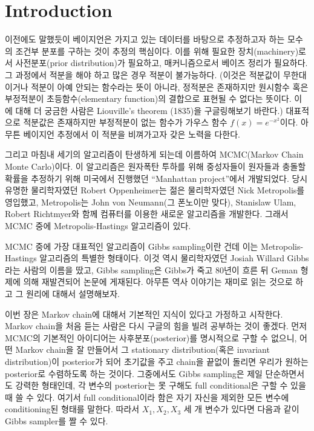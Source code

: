 \documentclass[a4paper, 10pt]{book}
\begin{document}
\section{Introduction}
  이전에도 말했듯이 베이지언은 가지고 있는 데이터를 바탕으로 추정하고자 하는 모수의 조건부 분포를 구하는 것이 추정의 핵심이다. 이를 위해 필요한 장치(machinery)로서 사전분포(prior distribution)가 필요하고, 매커니즘으로서 베이즈 정리가 필요하다. 그 과정에서 적분을 해야 하고 많은 경우 적분이 불가능하다. (이것은 적분값이 무한대이거나 적분이 아예 안되는 함수라는 뜻이 아니라, 정적분은 존재하지만 원시함수 혹은 부정적분이 초등함수(elementary function)의 결합으로 표현될 수 없다는 뜻이다. 이에 대해 더 궁금한 사람은 Liouville's theorem (1835)을 구글링해보기 바란다.) 대표적으로 적분값은 존재하지만 부정적분이 없는 함수가 가우스 함수 $f\left(x\right)= e^{-x^{2}}$이다. 아무튼 베이지언 추정에서 이 적분을 비껴가고자 갖은 노력을 다한다.\par
  그리고 마침내 세기의 알고리즘이 탄생하게 되는데 이름하여 MCMC(Markov Chain Monte Carlo)이다. 이 알고리즘은 원자폭탄 투하를 위해 중성자들이 원자들과 충돌할 확률을 추정하기 위해 미국에서 진행했던 ``Manhattan project''에서 개발되었다\cite{manhattanproject}. 당시 유명한 물리학자였던 Robert Oppenheimer는 젊은 물리학자였던 Nick Metropolis를 영입했고, Metropolis는 John von Neumann(그 폰노이만 맞다), Stanislaw Ulam, Robert Richtmyer와 함께 컴퓨터를 이용한 새로운 알고리즘을 개발한다. 그래서 MCMC 중에 Metropolis-Hastings 알고리즘이 있다.\par
  MCMC 중에 가장 대표적인 알고리즘이 Gibbs sampling이란 건데 이는 Metropolis-Hastings 알고리즘의 특별한 형태이다. 이것 역시 물리학자였던 Josiah Willard Gibbs라는 사람의 이름을 땄고, Gibbs sampling은 Gibbs가 죽고 80년이 흐른 뒤 Geman 형제에 의해 재발견되어 논문에 게재된다. 아무튼 역사 이야기는 재미로 읽는 것으로 하고 그 원리에 대해서 설명해보자. \par
  이번 장은 Markov chain에 대해서 기본적인 지식이 있다고 가정하고 시작한다. Markov chain을 처음 듣는 사람은 다시 구글의 힘을 빌려 공부하는 것이 좋겠다. 먼저 MCMC의 기본적인 아이디어는 사후분포(posterior)를 명시적으로 구할 수 없으니, 어떤 Markov chain을 잘 만들어서 그 stationary distribution(혹은 invariant distribution)이 posterior가 되어 초기값을 주고 chain을 끝없이 돌리면 우리가 원하는 posterior로 수렴하도록 하는 것이다. 그중에서도 Gibbs sampling은 제일 단순하면서도 강력한 형태인데, 각 변수의 posterior는 못 구해도 full conditional은 구할 수 있을 때 쓸 수 있다. 여기서 full conditional이라 함은 자기 자신을 제외한 모든 변수에 conditioning된 형태를 말한다. 따라서 $X_{1}, X_{2}, X_{3}$ 세 개 변수가 있다면 다음과 같이 Gibbs sampler를 짤 수 있다.
\end{document}
